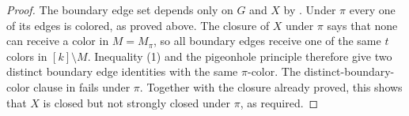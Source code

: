 \begin{proof}
The boundary edge set depends only on $G$ and $X$ by
.  Under $\pi$ every one of its edges is colored,
as proved above.  The closure of $X$ under $\pi$ says that none can receive
a color in $M=M_\pi$, so all boundary edges receive one of the same $t$
colors in $[k]\setminus M$.  Inequality (1) and the pigeonhole principle
therefore give two distinct boundary edge identities with the same
$\pi$-color.  The distinct-boundary-color clause in
 fails under $\pi$.  Together with
the closure already proved, this shows that $X$ is closed but not strongly
closed under $\pi$, as required.
\end{proof}
